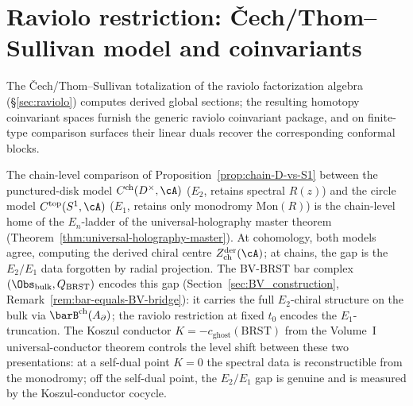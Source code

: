 \section{Raviolo restriction: Čech/Thom--Sullivan model and coinvariants}
\label{sec:raviolo-expanded}

The \v{C}ech/Thom--Sullivan totalization of the raviolo factorization algebra (\S\ref{sec:raviolo}) computes derived global sections; the resulting homotopy coinvariant spaces furnish the generic raviolo coinvariant package, and on finite-type comparison surfaces their linear duals recover the corresponding conformal blocks.

\begin{remark}
\label{rem:raviolo-D-S1-universal-holography}
The chain-level comparison of Proposition~\ref{prop:chain-D-vs-S1} between
the punctured-disk model $C^{\mathrm{ch}}(D^\times,\cA)$ ($E_2$, retains
spectral $R(z)$) and the circle model $C^{\mathrm{top}}(S^1,\cA)$ ($E_1$,
retains only monodromy $\mathrm{Mon}(R)$) is the chain-level home of the
$E_n$-ladder of the universal-holography master theorem
(Theorem~\ref{thm:universal-holography-master}).
At cohomology, both models agree, computing the derived chiral centre $Z^{\mathrm{der}}_{\mathrm{ch}}(\cA)$;
at chains, the gap is the $E_2/E_1$ data forgotten by radial
projection. The BV-BRST bar complex
$(\Obs_{\mathrm{bulk}}, Q_{\mathrm{BRST}})$ encodes this gap (Section~\ref{sec:BV_construction},
Remark~\ref{rem:bar-equals-BV-bridge}): it carries the full $E_2$-chiral
structure on the bulk via $\barB^{\mathrm{ch}}(A_\partial)$; the
raviolo restriction at fixed $t_0$ encodes the $E_1$-truncation. The
Koszul conductor $K = -c_{\mathrm{ghost}}(\mathrm{BRST})$
from the Volume~I universal-conductor theorem controls the level shift
between these two presentations: at a self-dual point $K=0$ the spectral
data is reconstructible from the monodromy; off the self-dual point, the
$E_2/E_1$ gap is genuine and is measured by the Koszul-conductor cocycle.
\end{remark}

